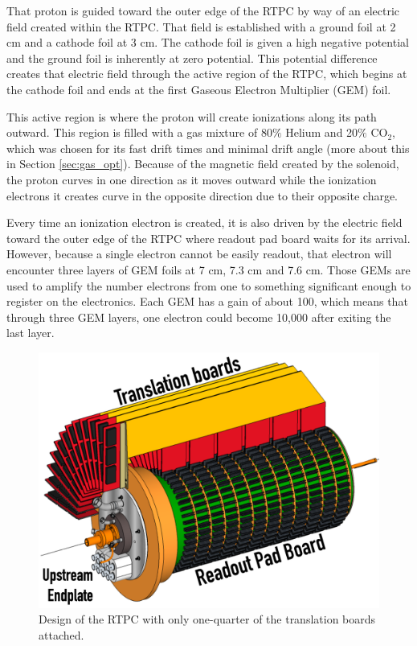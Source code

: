 That proton is guided toward the outer edge of the RTPC by way of an electric field created within the RTPC. That field is established with a ground foil at 2 cm and a cathode foil at 3 cm. The cathode foil is given a high negative potential and the ground foil is inherently at zero potential. This potential difference creates that electric field through the active region of the RTPC, which begins at the cathode foil and ends at the first Gaseous Electron Multiplier (GEM) foil. 

This active region is where the proton will create ionizations along its path outward. This region is filled with a gas mixture of 80$\%$ Helium and 20$\%$ CO$_2$, which was chosen for its fast drift times and minimal drift angle (more about this in Section \ref{sec:gas_opt}). Because of the magnetic field created by the solenoid, the proton curves in one direction as it moves outward while the ionization electrons it creates curve in the opposite direction due to their opposite charge.

Every time an ionization electron is created, it is also driven by the electric field toward the outer edge of the RTPC where readout pad board waits for its arrival. However, because a single electron cannot be easily readout, that electron will encounter three layers of GEM foils at 7 cm, 7.3 cm and 7.6 cm. Those GEMs are used to amplify the number electrons from one to something significant enough to register on the electronics. Each GEM has a gain of about 100, which means that through three GEM layers, one electron could become 10,000 after exiting the last layer.

\begin{figure}[h!]
	\centering
	\includegraphics[width=0.8\linewidth]{figures/rtpc_design.png}
	\caption{Design of the RTPC with only one-quarter of the translation boards attached.}
	\label{fig:rtpc_design}
\end{figure}

